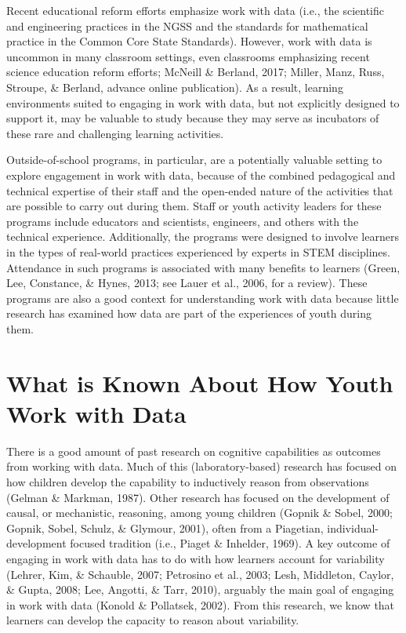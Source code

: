 \documentclass[]{msu-thesis}
\theoremstyle{definition}
\theoremstyle{definition}
\theoremstyle{definition}
\theoremstyle{remark}
\begin{document}
Recent educational reform efforts emphasize work with data (i.e., the
scientific and engineering practices in the NGSS and the standards for
mathematical practice in the Common Core State Standards). However, work
with data is uncommon in many classroom settings, even classrooms
emphasizing recent science education reform efforts; McNeill \& Berland,
2017; Miller, Manz, Russ, Stroupe, \& Berland, advance online
publication). As a result, learning environments suited to engaging in
work with data, but not explicitly designed to support it, may be
valuable to study because they may serve as incubators of these rare and
challenging learning activities.

Outside-of-school programs, in particular, are a potentially valuable
setting to explore engagement in work with data, because of the combined
pedagogical and technical expertise of their staff and the open-ended
nature of the activities that are possible to carry out during them.
Staff or youth activity leaders for these programs include educators and
scientists, engineers, and others with the technical experience.
Additionally, the programs were designed to involve learners in the
types of real-world practices experienced by experts in STEM
disciplines. Attendance in such programs is associated with many
benefits to learners (Green, Lee, Constance, \& Hynes, 2013; see Lauer
et al., 2006, for a review). These programs are also a good context for
understanding work with data because little research has examined how
data are part of the experiences of youth during them.

\section{What is Known About How Youth Work with
Data}\label{what-is-known-about-how-youth-work-with-data}

There is a good amount of past research on cognitive capabilities as
outcomes from working with data. Much of this (laboratory-based)
research has focused on how children develop the capability to
inductively reason from observations (Gelman \& Markman, 1987). Other
research has focused on the development of causal, or mechanistic,
reasoning, among young children (Gopnik \& Sobel, 2000; Gopnik, Sobel,
Schulz, \& Glymour, 2001), often from a Piagetian,
individual-development focused tradition (i.e., Piaget \& Inhelder,
1969). A key outcome of engaging in work with data has to do with how
learners account for variability (Lehrer, Kim, \& Schauble, 2007;
Petrosino et al., 2003; Lesh, Middleton, Caylor, \& Gupta, 2008; Lee,
Angotti, \& Tarr, 2010), arguably the main goal of engaging in work with
data (Konold \& Pollatsek, 2002). From this research, we know that
learners can develop the capacity to reason about variability.
\end{document}
